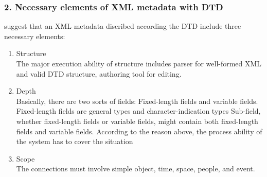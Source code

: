 \documentclass[a4paper]{article} %
\begin{document}
\subsubsection*{2. Necessary elements of XML metadata with DTD}
\label{sec:mets}
{\bf\cite{Ruey-Shun:2003:DevelopinganXMLframeworkformetadatasystem}} suggest that an XML metadata discribed according the DTD include three necessary elements:
\begin{enumerate}
	\item Structure\\
	The major execution ability of structure includes parser for well-formed XML and
	valid DTD structure, authoring tool for editing.
	
	\item Depth\\
	Basically, there are two sorts of fields: Fixed-length fields and variable fields.
	Fixed-length fields are general types and character-indication types Sub-field, whether
	fixed-length fields or variable fields, might contain both fixed-length fields and
	variable fields. According to the reason above, the process ability of the system has to
	cover the situation
	
	\item Scope\\
	The connections must involve simple object, time, space, people, and event. 
\end{enumerate}
\end{document}

